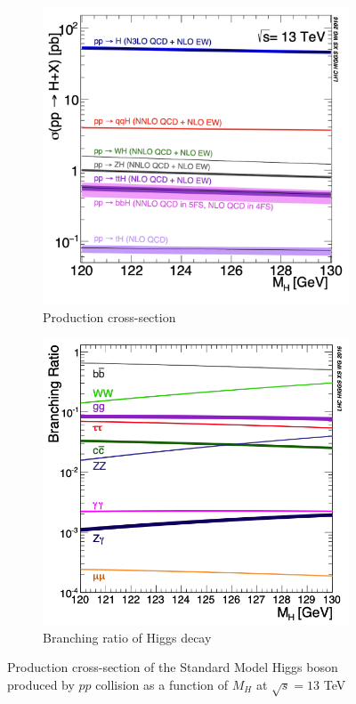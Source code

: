 \begin{figure}[h!]
    \begin{subfigure}[b]{0.48\textwidth}
        \centering
        \includegraphics[width=\textwidth]{figures/higgs-xs.png}
        \caption{Production cross-section}
        \label{subfig:higgs-production-xs}
    \end{subfigure}
    \begin{subfigure}[b]{0.48\textwidth}
        \centering 
        \includegraphics[width=\textwidth]{figures/higgs-branching-ratios.png}
        \caption{Branching ratio of Higgs decay}
        \label{subfig:higgs-br}
    \end{subfigure}
    \caption{Production cross-section of the Standard Model Higgs boson produced by $pp$ collision as a function of $M_H$ at $\sqrt{s}=13$ TeV}
    \label{fig:higgs-production-decay}
\end{figure}

